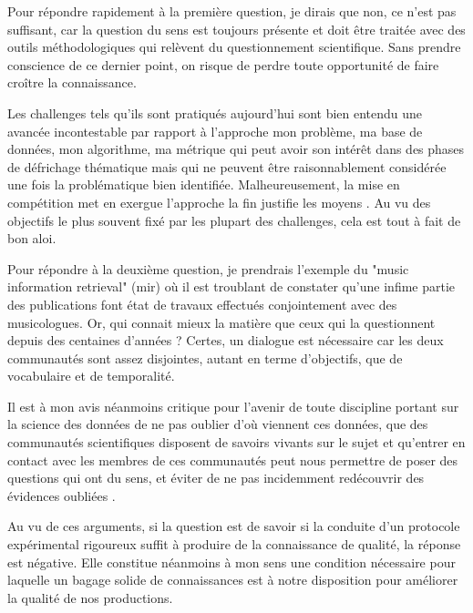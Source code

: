 Pour répondre rapidement à la première question, je dirais que non, ce n'est pas suffisant, car la question du sens est toujours présente et doit être traitée avec des outils méthodologiques qui relèvent du questionnement scientifique. Sans prendre conscience de ce dernier point, on risque de perdre toute opportunité de faire croître la connaissance.

Les challenges tels qu'ils sont pratiqués aujourd'hui sont bien entendu une avancée incontestable par rapport à l'approche \og mon problème, ma base de données, mon algorithme, ma métrique \fg qui peut avoir son intérêt dans des phases de défrichage thématique mais qui ne peuvent être raisonnablement considérée une fois la problématique bien identifiée. Malheureusement, la mise en compétition met en exergue l'approche \og la fin justifie les moyens \fg. Au vu des objectifs le plus souvent fixé par les plupart des challenges, cela est tout à fait de bon aloi.

Pour répondre à la deuxième question, je prendrais l'exemple du "music information retrieval" (mir) où il est troublant de constater qu'une infime partie des publications font état de travaux effectués conjointement avec des musicologues. Or, qui connait mieux la matière que ceux qui la questionnent depuis des centaines d'années ? Certes, un dialogue est nécessaire car les deux communautés sont assez disjointes, autant en terme d'objectifs, que de vocabulaire et de temporalité.

Il est à mon avis néanmoins critique pour l'avenir de toute discipline portant sur la science des données de ne pas oublier d'où viennent ces données, que des communautés scientifiques disposent de savoirs vivants sur le sujet et qu'entrer en contact avec les membres de ces communautés peut nous permettre de poser des questions qui ont du sens, et éviter de ne pas incidemment redécouvrir des évidences \og oubliées \fg.

Au vu de ces arguments, si la question est de savoir si la conduite d'un protocole expérimental rigoureux suffit à produire de la connaissance de qualité, la réponse est négative. Elle constitue néanmoins à mon sens une condition nécessaire pour laquelle un bagage solide de connaissances est à notre disposition pour améliorer la qualité de nos productions.

